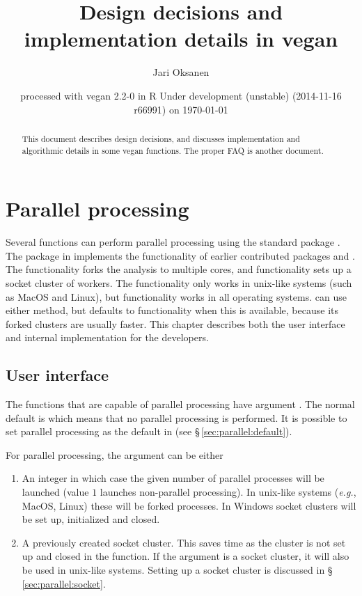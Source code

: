 \documentclass[a4paper,10pt,twocolumn]{article}
\author{Jari Oksanen}
\title{Design decisions and implementation details in vegan}
\date{\footnotesize{
  processed with vegan
2.2-0
in R Under development (unstable) (2014-11-16 r66991) on \today}}
\begin{document}




\maketitle

\begin{abstract}
  This document describes design decisions, and discusses implementation
and algorithmic details in some vegan functions. The proper FAQ is
another document.
\end{abstract}

\tableofcontents

\section{Parallel processing}

Several  functions can perform parallel processing using
the standard \R{} package . 
The  package in \R{} implements
the functionality of earlier contributed packages  and
.  The  functionality forks the analysis to
multiple cores, and  functionality sets up a socket cluster
of workers.  The  functionality only works in unix-like
systems (such as MacOS and Linux), but  functionality works
in all operating systems.   can use either method, but
defaults to  functionality when this is available,
because its forked clusters are usually faster.  This chapter
describes both the user interface and internal implementation for the
developers.

\subsection{User interface}
\label{sec:parallel:ui}

The functions that are capable of parallel processing have argument
.  The normal default is  which
means that no parallel processing is performed.  It is possible to set
parallel processing as the default in  (see
\S\,\ref{sec:parallel:default}). 

For parallel processing, the  argument can be either

\begin{enumerate}
\item An integer in which case the given number of parallel processes
  will be launched (value $1$ launches non-parallel processing). In
  unix-like systems (\emph{e.g.}, MacOS, Linux) these will be forked
   processes. In Windows socket clusters will be set up,
  initialized and closed.
\item A previously created socket cluster. This saves time as the
  cluster is not set up and closed in the function.  If the argument is a
  socket cluster, it will also be used in unix-like systems. Setting
  up a socket cluster is discussed in \S\,\ref{sec:parallel:socket}.
\end{enumerate}
\end{document}
